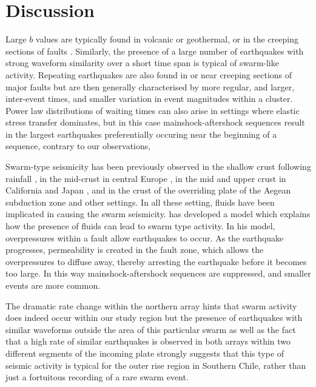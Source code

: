 \documentclass[reviewcopy]{elsart}
\begin{document}
\section{Discussion}

Large $b$ values are typically found in volcanic or geothermal, or in
the creeping sections of faults \citep{wiemer02}.  
Similarly, the presence of a large number of earthquakes with strong
waveform similarity over a short time span is typical of
swarm-like activity.  Repeating earthquakes are also found in or near creeping
sections of major faults \citep[e.g.][]{nadeau98} but are then
generally characterised by more regular, and larger, inter-event
times, and smaller variation in event magnitudes within a
cluster. Power law distributions of waiting times can also
arise in settings where elastic stress transfer dominates, but in this
case mainshock-aftershock sequences result in the largest earthquakes
preferentially occuring near the beginning of a sequence, contrary to
our observations, 

Swarm-type seismicity has been
previously observed in the shallow crust following rainfall
\citep{kraft06}, in the mid-crust in central Europe \citep{kurz04}, in
the mid and upper crust in California and Japan \citep{vidale06}, and
in the crust of the overriding plate of the Aegean subduction zone
\citep{becker06} and other settings.  In all these setting, fluids
have been implicated in causing the swarm seismicity.   \citet{yamashita99} has developed a model which
explains how the presence of fluids can lead to swarm type activity.
In his model, overpressures within a fault allow earthquakes to
occur.  As the earthquake progresses, permeability is created in the
fault zone, which allows the overpressures to diffuse away, thereby
arresting the earthquake before it becomes too large.  In this way
mainshock-aftershock sequences are suppressed, and smaller events are
more common. 

The dramatic rate change within the northern array hints that swarm
activity does indeed occur within our study region but the presence of
 earthquakes with similar waveforms outside the area of this particular swarm as well
as the fact that a high rate of similar earthquakes is observed in
both arrays within two different segments of the incoming plate
strongly suggests that this type of seismic activity is typical for
the outer rise region in Southern Chile, rather than just a fortuitous
recording of a rare swarm event.
\end{document}

